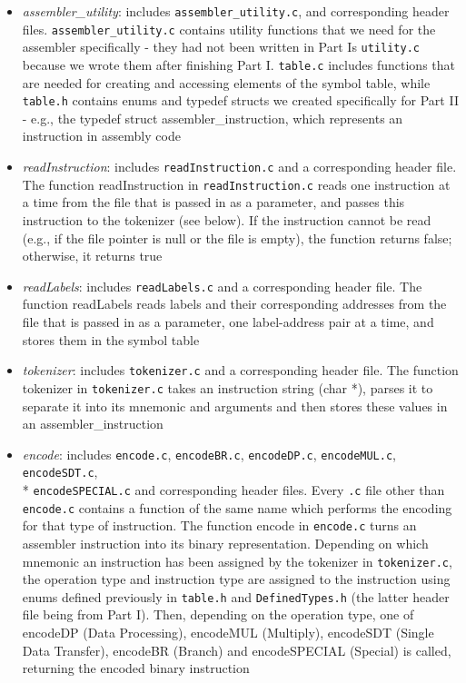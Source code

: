 \documentclass[letterpaper,11pt]{article}
\begin{document}
    \begin{itemize}
        \item \textit{assembler\_utility}: includes \texttt{assembler\_utility.c},  and corresponding header files. \texttt{assembler\_utility.c} contains utility functions that we need for the assembler specifically - they had not been written in Part I\textquotesingle s \texttt{utility.c} because we wrote them after finishing Part I. \texttt{table.c} includes functions that are needed for creating and accessing elements of the symbol table, while \texttt{table.h} contains enums and typedef structs we created specifically for Part II - e.g., the typedef struct assembler\_instruction, which represents an instruction in assembly code
        \item \textit{readInstruction}: includes \texttt{readInstruction.c} and a corresponding header file. The function readInstruction in \texttt{readInstruction.c} reads one instruction at a time from the file that is passed in as a parameter, and passes this instruction to the tokenizer (see below). If the instruction cannot be read (e.g., if the file pointer is null or the file is empty), the function returns false; otherwise, it returns true
        \item \textit{readLabels}: includes \texttt{readLabels.c} and a corresponding header file. The function readLabels reads labels and their corresponding addresses from the file that is passed in as a parameter, one label-address pair at a time, and stores them in the symbol table
        \item \textit{tokenizer}: includes \texttt{tokenizer.c} and a corresponding header file. The function tokenizer in \texttt{tokenizer.c} takes an instruction string (char *), parses it to separate it into its mnemonic and arguments and then stores these values in an assembler\_instruction
        \item \textit{encode}: includes \texttt{encode.c}, \texttt{encodeBR.c}, \texttt{encodeDP.c}, \texttt{encodeMUL.c}, \texttt{encodeSDT.c}, \\* \texttt{encodeSPECIAL.c} and corresponding header files. Every \texttt{.c} file other than \texttt{encode.c} contains a function of the same name which performs the encoding for that type of instruction. The function encode in \texttt{encode.c} turns an assembler instruction into its binary representation. Depending on which mnemonic an instruction has been assigned by the tokenizer in \texttt{tokenizer.c}, the operation type and instruction type are assigned to the instruction using enums defined previously in \texttt{table.h} and \texttt{DefinedTypes.h} (the latter header file being from Part I). Then, depending on the operation type, one of encodeDP (Data Processing), encodeMUL (Multiply), encodeSDT (Single Data Transfer), encodeBR (Branch) and encodeSPECIAL (Special) is called, returning the encoded binary instruction

    \end{itemize}
\end{document}
